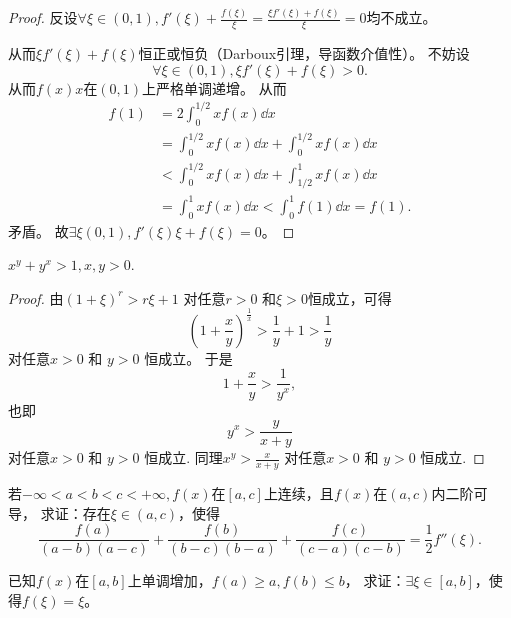   \begin{proof}
  反设$\forall\xi\in(0,1),f'(\xi)+\frac{f(\xi)}{\xi}=\frac{\xi f'(\xi)+f(\xi)}{\xi}=0$均不成立。
  
  从而$\xi f'(\xi)+f(\xi)$恒正或恒负（Darboux引理，导函数介值性）。
  不妨设
  \begin{equation*}
    \forall\xi\in(0,1),\xi f'(\xi)+f(\xi)>0.
  \end{equation*}
  从而$f(x)x$在$(0,1)$上严格单调递增。
  从而
  \begin{align*}
  f(1) 
  &=2\int_0^{1/2}xf(x)\dd x\\
  &=\int_0^{1/2}xf(x)\dd x 
  +\int_0^{1/2}xf(x)\dd x\\
  &<\int_0^{1/2}xf(x)\dd x 
  +\int_{1/2}^1xf(x)\dd x\\
  &=\int_0^1xf(x)\dd x
  <\int_0^1f(1)\dd x = f(1).
  \end{align*}
  矛盾。
  故$\exists\xi(0,1),f'(\xi)\xi+f(\xi)=0$。
  \end{proof}
  
  \begin{example}
  $x^y+y^x>1,x,y>0$.
  \end{example}
  
  \begin{proof}
  由$(1+\xi)^r>r\xi+1$ 对任意$r>0$ 和$\xi > 0$恒成立，可得
  \begin{equation*}
    (1+\frac{x}{y})^{\frac1x}>\frac1y+1>\frac1y
  \end{equation*}
  对任意$x>0$ 和 $y>0$ 恒成立。
  于是
  \begin{equation*}
    1+\frac xy>\frac{1}{y^x},
  \end{equation*}
  也即
  \begin{equation*}
    y^x>\frac{y}{x+y}
  \end{equation*}
  对任意$x>0$ 和 $y>0$ 恒成立.
  同理$x^y>\frac{x}{x+y}$ 对任意$x>0$ 和 $y>0$ 恒成立.  
  \end{proof}
  
  \begin{example}
   若$-\infty<a<b<c<+\infty,f(x)$在$[a,c]$上连续，且$f(x)$在$(a,c)$内二阶可导，
   求证：存在$\xi\in(a,c)$，使得
   \begin{equation*}
    \frac{f(a)}{(a-b)(a-c)}+\frac{f(b)}{(b-c)(b-a)}+\frac{f(c)}{(c-a)(c-b)}=\frac12f{''}(\xi).
   \end{equation*}
\end{example}

\begin{example}
  已知$f(x)$在$[a,b]$上单调增加，$f(a)\geq a,f(b)\leq b$，
  求证：$\exists\xi\in[a,b]$，使得$f(\xi)=\xi$。
\end{example}

